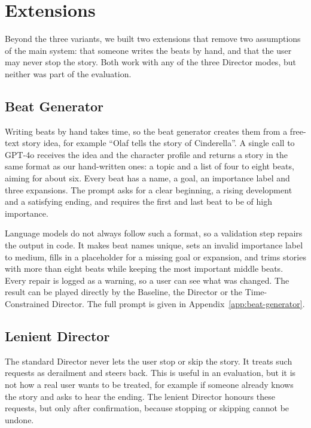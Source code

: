 \section{Extensions}\label{sec:extensions}

Beyond the three variants, we built two extensions that remove two assumptions of the main system: that someone writes the beats by hand, and that the user may never stop the story. Both work with any of the three Director modes, but neither was part of the evaluation.

\subsection{Beat Generator}

Writing beats by hand takes time, so the beat generator creates them from a free-text story idea, for example ``Olaf tells the story of Cinderella''. A single call to GPT-4o receives the idea and the character profile and returns a story in the same format as our hand-written ones: a topic and a list of four to eight beats, aiming for about six. Every beat has a name, a goal, an importance label and three expansions. The prompt asks for a clear beginning, a rising development and a satisfying ending, and requires the first and last beat to be of high importance.

Language models do not always follow such a format, so a validation step repairs the output in code. It makes beat names unique, sets an invalid importance label to medium, fills in a placeholder for a missing goal or expansion, and trims stories with more than eight beats while keeping the most important middle beats. Every repair is logged as a warning, so a user can see what was changed. The result can be played directly by the Baseline, the Director or the Time-Constrained Director. The full prompt is given in Appendix~\ref{app:beat-generator}.

\subsection{Lenient Director}

The standard Director never lets the user stop or skip the story. It treats such requests as derailment and steers back. This is useful in an evaluation, but it is not how a real user wants to be treated, for example if someone already knows the story and asks to hear the ending. The lenient Director honours these requests, but only after confirmation, because stopping or skipping cannot be undone.

